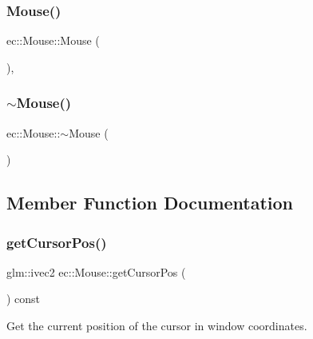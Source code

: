 \subsubsection{\texorpdfstring{Mouse()}{Mouse()}}
{\footnotesize\ttfamily ec\+::\+Mouse\+::\+Mouse (\begin{DoxyParamCaption}{ }\end{DoxyParamCaption})\hspace{0.3cm}{\ttfamily [explicit]}, {\ttfamily [default]}}

\mbox{\label{classec_1_1_mouse_a49441335e64c7bf098217f0698975aa4}} 
\subsubsection{\texorpdfstring{$\sim$\+Mouse()}{~Mouse()}}
{\footnotesize\ttfamily ec\+::\+Mouse\+::$\sim$\+Mouse (\begin{DoxyParamCaption}{ }\end{DoxyParamCaption})\hspace{0.3cm}{\ttfamily [default]}}



\subsection{Member Function Documentation}
\mbox{\label{classec_1_1_mouse_ac78aee81c618536c76a74852d344128d}} 
\subsubsection{\texorpdfstring{get\+Cursor\+Pos()}{getCursorPos()}}
{\footnotesize\ttfamily glm\+::ivec2 ec\+::\+Mouse\+::get\+Cursor\+Pos (\begin{DoxyParamCaption}{ }\end{DoxyParamCaption}) const}

Get the current position of the cursor in window coordinates. \mbox{\label{classec_1_1_mouse_a7daf494a5600c6ffa5278e201b68963f}} 
